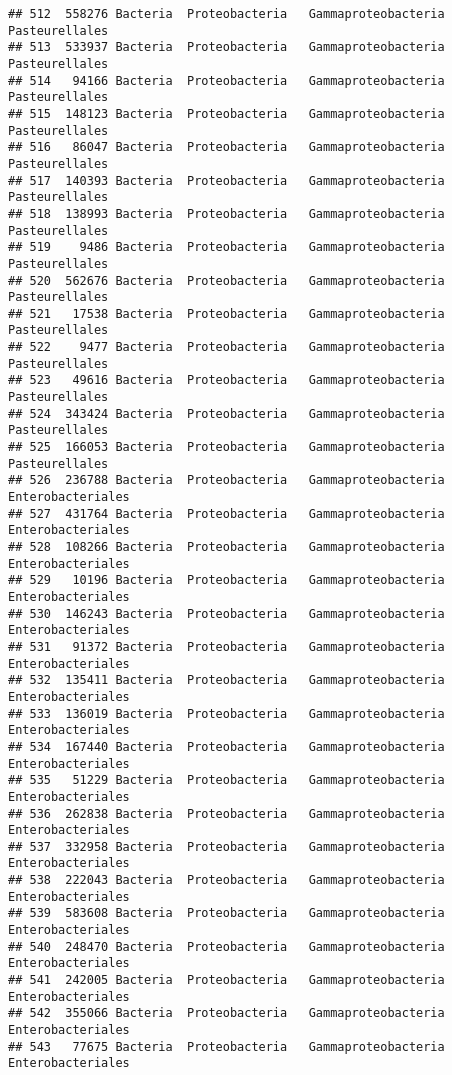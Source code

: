 \documentclass[
]{article}
\begin{document}
\begin{verbatim}
## 512  558276 Bacteria  Proteobacteria   Gammaproteobacteria      Pasteurellales
## 513  533937 Bacteria  Proteobacteria   Gammaproteobacteria      Pasteurellales
## 514   94166 Bacteria  Proteobacteria   Gammaproteobacteria      Pasteurellales
## 515  148123 Bacteria  Proteobacteria   Gammaproteobacteria      Pasteurellales
## 516   86047 Bacteria  Proteobacteria   Gammaproteobacteria      Pasteurellales
## 517  140393 Bacteria  Proteobacteria   Gammaproteobacteria      Pasteurellales
## 518  138993 Bacteria  Proteobacteria   Gammaproteobacteria      Pasteurellales
## 519    9486 Bacteria  Proteobacteria   Gammaproteobacteria      Pasteurellales
## 520  562676 Bacteria  Proteobacteria   Gammaproteobacteria      Pasteurellales
## 521   17538 Bacteria  Proteobacteria   Gammaproteobacteria      Pasteurellales
## 522    9477 Bacteria  Proteobacteria   Gammaproteobacteria      Pasteurellales
## 523   49616 Bacteria  Proteobacteria   Gammaproteobacteria      Pasteurellales
## 524  343424 Bacteria  Proteobacteria   Gammaproteobacteria      Pasteurellales
## 525  166053 Bacteria  Proteobacteria   Gammaproteobacteria      Pasteurellales
## 526  236788 Bacteria  Proteobacteria   Gammaproteobacteria   Enterobacteriales
## 527  431764 Bacteria  Proteobacteria   Gammaproteobacteria   Enterobacteriales
## 528  108266 Bacteria  Proteobacteria   Gammaproteobacteria   Enterobacteriales
## 529   10196 Bacteria  Proteobacteria   Gammaproteobacteria   Enterobacteriales
## 530  146243 Bacteria  Proteobacteria   Gammaproteobacteria   Enterobacteriales
## 531   91372 Bacteria  Proteobacteria   Gammaproteobacteria   Enterobacteriales
## 532  135411 Bacteria  Proteobacteria   Gammaproteobacteria   Enterobacteriales
## 533  136019 Bacteria  Proteobacteria   Gammaproteobacteria   Enterobacteriales
## 534  167440 Bacteria  Proteobacteria   Gammaproteobacteria   Enterobacteriales
## 535   51229 Bacteria  Proteobacteria   Gammaproteobacteria   Enterobacteriales
## 536  262838 Bacteria  Proteobacteria   Gammaproteobacteria   Enterobacteriales
## 537  332958 Bacteria  Proteobacteria   Gammaproteobacteria   Enterobacteriales
## 538  222043 Bacteria  Proteobacteria   Gammaproteobacteria   Enterobacteriales
## 539  583608 Bacteria  Proteobacteria   Gammaproteobacteria   Enterobacteriales
## 540  248470 Bacteria  Proteobacteria   Gammaproteobacteria   Enterobacteriales
## 541  242005 Bacteria  Proteobacteria   Gammaproteobacteria   Enterobacteriales
## 542  355066 Bacteria  Proteobacteria   Gammaproteobacteria   Enterobacteriales
## 543   77675 Bacteria  Proteobacteria   Gammaproteobacteria   Enterobacteriales

\end{verbatim}
\end{document}
